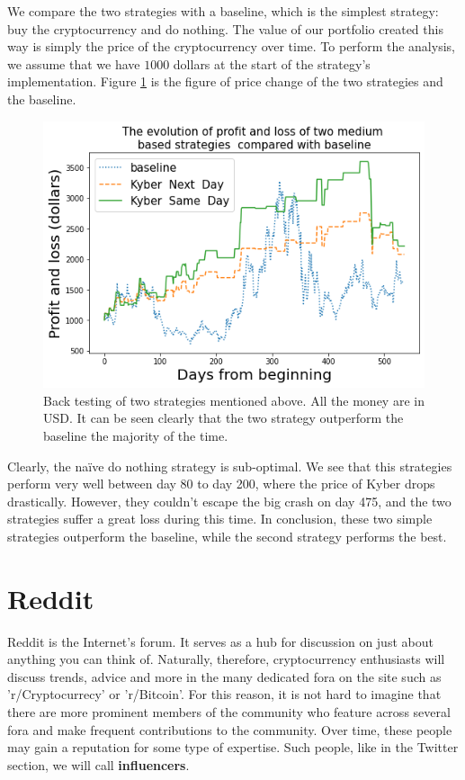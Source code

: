 \documentclass[twoside]{report}
\begin{document}
\begin{spacing}{1}
We compare the two strategies with a baseline, which is the simplest strategy: buy the cryptocurrency and do nothing. The value of our portfolio created this way is simply the price of the cryptocurrency over time. To perform the analysis, we assume that we have $1000$ dollars at the start of the strategy's implementation. Figure \ref{backtest medium} is the figure of price change of the two strategies and the baseline.

\begin{figure}[!h]
    \centering
    \includegraphics[scale =  0.65]{Images/medium backtesting.png}
    \caption{Back testing of two strategies mentioned above. All the money are in USD. It can be seen clearly that the two strategy outperform the baseline the majority of the time.}
    \label{backtest medium}
\end{figure}

Clearly, the naïve do nothing strategy is sub-optimal. We see that this strategies perform very well between day 80 to day 200, where the price of Kyber drops drastically. However, they couldn't escape the big crash on day 475, and the two strategies suffer a great loss during this time. In conclusion, these two simple strategies outperform the baseline, while the second strategy performs the best.

\section{Reddit}\label{reddit}
Reddit is the Internet's forum. It serves as a hub for discussion on just about anything you can think of. Naturally, therefore, cryptocurrency enthusiasts will discuss trends, advice and more in the many dedicated fora on the site such as 'r/Cryptocurrecy' or 'r/Bitcoin'. For this reason, it is not hard to imagine that there are more prominent members of the community who feature across several fora and make frequent contributions to the community. Over time, these people may gain a reputation for some type of expertise. Such people, like in the Twitter section, we will call  \textbf{influencers}. 


\end{spacing}
\end{document}
